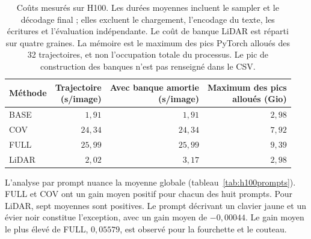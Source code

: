 \documentclass[11pt,a4paper]{article}
\begin{document}
\begin{table}[!htb]
\centering\small
\begin{tabular}{lrrr}
\toprule
Méthode & \shortstack{Trajectoire\\(s/image)} & \shortstack{Avec banque amortie\\(s/image)} & \shortstack{Maximum des pics\\alloués (Gio)}\\
\midrule
BASE & $1{,}91$ & $1{,}91$ & $2{,}98$\\
COV & $24{,}34$ & $24{,}34$ & $7{,}92$\\
FULL & $25{,}99$ & $25{,}99$ & $9{,}39$\\
LiDAR & $2{,}02$ & $3{,}17$ & $2{,}98$\\
\bottomrule
\end{tabular}
\caption{Coûts mesurés sur H100. Les durées moyennes incluent le sampler et le décodage final ; elles excluent le chargement, l'encodage du texte, les écritures et l'évaluation indépendante. Le coût de banque LiDAR est réparti sur quatre graines. La mémoire est le maximum des pics PyTorch alloués des 32 trajectoires, et non l'occupation totale du processus. Le pic de construction des banques n'est pas renseigné dans le CSV.}
\label{tab:h100cost}
\end{table}

L'analyse par prompt nuance la moyenne globale (tableau~\ref{tab:h100prompts}). FULL et COV ont un gain moyen positif pour chacun des huit prompts. Pour LiDAR, sept moyennes sont positives. Le prompt décrivant un clavier jaune et un évier noir constitue l'exception, avec un gain moyen de $-0{,}00044$. Le gain moyen le plus élevé de FULL, $0{,}05579$, est observé pour la fourchette et le couteau.
\end{document}
